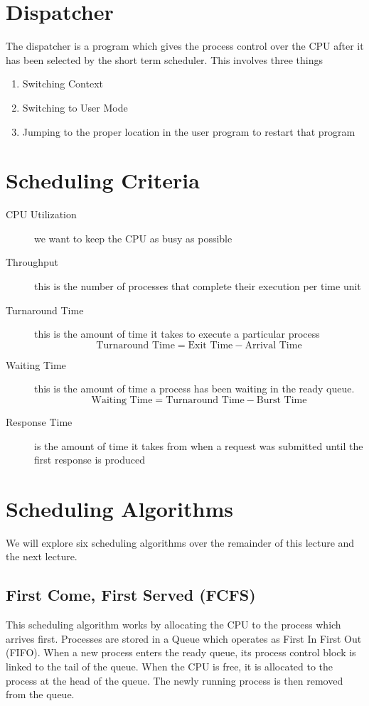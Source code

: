 \section{Dispatcher}
The dispatcher is a program which gives the process control over the CPU after it has been selected by the short term scheduler. This involves three things

\begin{enumerate}
    \item Switching Context
    \item Switching to User Mode
    \item Jumping to the proper location in the user program to restart that program
\end{enumerate}

\section{Scheduling Criteria}
\begin{description}
    \item[CPU Utilization] we want to keep the CPU as busy as possible
    \item[Throughput] this is the number of processes that complete their execution per time unit
    \item[Turnaround Time] this is the amount of time it takes to execute a particular process
    \[\text{Turnaround Time} = \text{Exit Time} - \text{Arrival Time}\]
    \item[Waiting Time] this is the amount of time a process has been waiting in the ready queue. 
    \[\text{Waiting Time} = \text{Turnaround Time} - \text{Burst Time}\]
    \item[Response Time] is the amount of time it takes from when a request was submitted until the first response is produced
\end{description}

\section{Scheduling Algorithms}
We will explore six scheduling algorithms over the remainder of this lecture and the next lecture.
\subsection{First Come, First Served (FCFS)}
This scheduling algorithm works by allocating the CPU to the process which arrives first. Processes are stored in a Queue which operates as First In First Out (FIFO). When a new process enters the ready queue, its process control block is linked to the tail of the queue. When the CPU is free, it is allocated to the process at the head of the queue. The newly running process is then removed from the queue.

